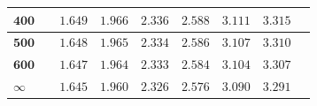 \begin{customTableWrapper}{1.3}
\begin{longtable}{|l|l l|l|l|l|l|l|l|}
    $\mathbf{400}$ & & ${1.649}$   & ${1.966}$   & ${2.336}$   & ${2.588}$   & ${3.111}$   & ${3.315}$   \\ \hline
    
    $\mathbf{500}$ & & ${1.648}$   & ${1.965}$   & ${2.334}$   & ${2.586}$   & ${3.107}$   & ${3.310}$   \\ \hline
    
    $\mathbf{600}$ & & ${1.647}$   & ${1.964}$   & ${2.333}$   & ${2.584}$   & ${3.104}$   & ${3.307}$   \\ \hline
 
 $\infty$ & & ${1.645}$   & ${1.960}$   & ${2.326}$   & ${2.576}$   & ${3.090}$   & ${3.291}$   \\ \hline
\end{longtable}
\end{customTableWrapper}
\changefontsizes{10pt}

